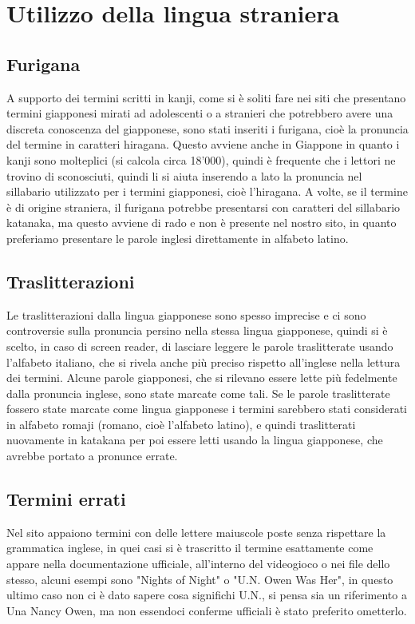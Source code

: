 \documentclass[openany, a4paper, 12pt]{report}
\begin{document}
		\section{Utilizzo della lingua straniera}
			\subsection{Furigana}
				A supporto dei termini scritti in kanji, come si è soliti fare nei siti che presentano termini giapponesi mirati ad adolescenti o a stranieri che potrebbero avere una discreta conoscenza del giapponese, sono stati inseriti i furigana, cioè la pronuncia del termine in caratteri hiragana.
				Questo avviene anche in Giappone in quanto i kanji sono molteplici (si calcola circa 18'000), quindi è frequente che i lettori ne trovino di sconosciuti, quindi li si aiuta inserendo a lato la pronuncia nel sillabario utilizzato per i termini giapponesi, cioè l'hiragana.
				A volte, se il termine è di origine straniera, il furigana potrebbe presentarsi con caratteri del sillabario katanaka, ma questo avviene di rado e non è presente nel nostro sito, in quanto preferiamo presentare le parole inglesi direttamente in alfabeto latino. 
			\subsection{Traslitterazioni}
				Le traslitterazioni dalla lingua giapponese sono spesso imprecise e ci sono controversie sulla pronuncia persino nella stessa lingua giapponese, quindi si è scelto, in caso di screen reader, di lasciare leggere le parole traslitterate usando l'alfabeto italiano, che si rivela anche più preciso rispetto all'inglese nella lettura dei termini.
				Alcune parole giapponesi, che si rilevano essere lette più fedelmente dalla pronuncia inglese, sono state marcate come tali.
				Se le parole traslitterate fossero state marcate come lingua giapponese i termini sarebbero stati considerati in alfabeto romaji (romano, cioè l'alfabeto latino), e quindi traslitterati nuovamente in katakana per poi essere letti usando la lingua giapponese, che avrebbe portato a pronunce errate.
			\subsection{Termini errati}
				Nel sito appaiono termini con delle lettere maiuscole poste senza rispettare la grammatica inglese, in quei casi si è trascritto il termine esattamente come appare nella documentazione ufficiale, all'interno del videogioco o nei file dello stesso, alcuni esempi sono "Nights of Night" o "U.N. Owen Was Her", in questo ultimo caso non ci è dato sapere cosa significhi U.N., si pensa sia un riferimento a Una Nancy Owen, ma non essendoci conferme ufficiali è stato preferito ometterlo.\\
			
\end{document}
